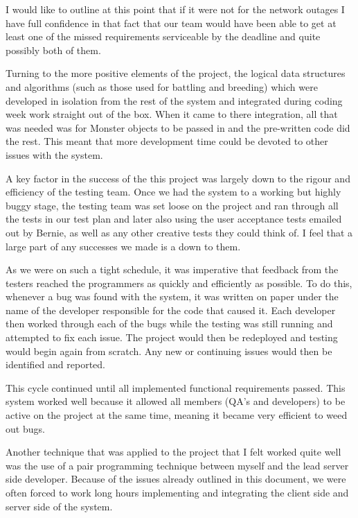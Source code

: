 \documentclass{article}
\begin{document}
I would like to outline at this point that if it were not for the network outages I have full confidence in that fact that our team would have been able to get at least one of the missed requirements serviceable by the deadline and quite possibly both of them.

Turning to the more positive elements of the project, the logical data structures and algorithms (such as those used for battling and breeding) which were developed in isolation from the rest of the system and integrated during coding week work straight out of the box. When it came to there integration, all that was needed was for Monster objects to be passed in and the pre-written code did the rest. This meant that more development time could be devoted to other issues with the system.

A key factor in the success of the this project was largely down to the rigour and efficiency of the testing team. Once we had the system to a working but highly buggy stage, the testing team was set loose on the project and ran through all the tests in our test plan and later also using the user acceptance tests emailed out by Bernie, as well as any other creative tests they could think of. I feel that a large part of any successes we made is a down to them.

As we were on such a tight schedule, it was imperative that feedback from the testers reached the programmers as quickly and efficiently as possible. To do this, whenever a bug was found with the system, it was written on paper under the name of the developer responsible for the code that caused it. Each developer then worked through each of the bugs while the testing was still running and attempted to fix each issue. The project would then be redeployed and testing would begin again from scratch. Any new or continuing issues would then be identified and reported. 

This cycle continued until all implemented functional requirements passed. This system worked well because it allowed all members (QA's and developers) to be active on the project at the same time, meaning it became very efficient to weed out bugs.

Another technique that was applied to the project that I felt worked quite well was the use of a pair programming technique between myself and the lead server side developer. Because of the issues already outlined in this document, we were often forced to work long hours implementing and integrating the client side and server side of the system. 
\end{document}
